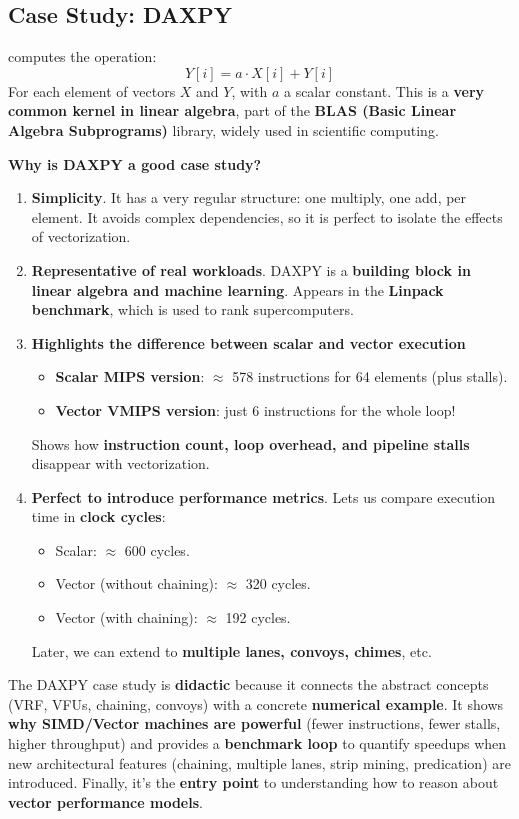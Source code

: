 \subsection{Case Study: DAXPY}

 computes the operation:
\begin{equation}
    Y[i] = a \cdot X[i] + Y[i]
\end{equation}
For each element of vectors $X$ and $Y$, with $a$ a scalar constant. This is a \textbf{very common kernel in linear algebra}, part of the \textbf{BLAS (Basic Linear Algebra Subprograms)} library, widely used in scientific computing.

\highspace
\begin{flushleft}
    \textcolor{Green3}{ \textbf{Why is DAXPY a good case study?}}
\end{flushleft}
\begin{enumerate}
    \item \textbf{Simplicity}. It has a very regular structure: one multiply, one add, per element. It avoids complex dependencies, so it is perfect to isolate the effects of vectorization.
    \item \textbf{Representative of real workloads}. DAXPY is a \textbf{building block in linear algebra and machine learning}. Appears in the \textbf{Linpack benchmark}, which is used to rank supercomputers.
    \item \textbf{Highlights the difference between scalar and vector execution}
    \begin{itemize}
        \item \textbf{Scalar MIPS version}: $\approx$ 578 instructions for 64 elements (plus stalls).
        \item \textbf{Vector VMIPS version}: just 6 instructions for the whole loop!
    \end{itemize}
    Shows how \textbf{instruction count, loop overhead, and pipeline stalls} disappear with vectorization.
    \item \textbf{Perfect to introduce performance metrics}. Lets us compare execution time in \textbf{clock cycles}:
    \begin{itemize}
        \item Scalar: $\approx$ 600 cycles.
        \item Vector (without chaining): $\approx$ 320 cycles.
        \item Vector (with chaining): $\approx$ 192 cycles.
    \end{itemize}
    Later, we can extend to \textbf{multiple lanes, convoys, chimes}, etc.
\end{enumerate}
The DAXPY case study is \textbf{didactic} because it connects the abstract concepts (VRF, VFUs, chaining, convoys) with a concrete \textbf{numerical example}. It shows \textbf{why SIMD/Vector machines are powerful} (fewer instructions, fewer stalls, higher throughput) and provides a \textbf{benchmark loop} to quantify speedups when new architectural features (chaining, multiple lanes, strip mining, predication) are introduced. Finally, it's the \textbf{entry point} to understanding how to reason about \textbf{vector performance models}.